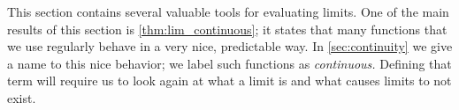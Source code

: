 This section contains several valuable tools for evaluating limits. One of the main results of this section is \autoref{thm:lim_continuous}; it states that many functions that we use regularly behave in a very nice, predictable way. In \autoref{sec:continuity} we give a name to this nice behavior; we label such functions as \textit{continuous.} Defining that term will require us to look again at what a limit is and what causes limits to not exist.

